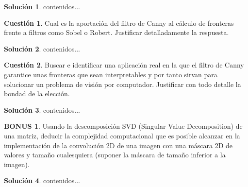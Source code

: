 \documentclass[a4paper, 11pt]{article}
\theoremstyle{definition}
\newtheorem{cuestion}{Cuestión}
\newtheorem*{solucion}{Solución}
\newtheorem*{bonus}{BONUS}
\begin{document}
  \begin{solucion}
     	contenidos...
  \end{solucion}
  \begin{cuestion}
     	Cual es la aportación del filtro de Canny al cálculo de fronteras
      frente a filtros como Sobel o Robert. Justificar detalladamente la
      respuesta.
  \end{cuestion}

  \begin{solucion}
     	contenidos...
  \end{solucion}
  \begin{cuestion}
     	Buscar e identificar una aplicación real en la que el filtro de
      Canny garantice unas fronteras que sean interpretables y por tanto sirvan
       para solucionar un problema de visión por computador.
        Justificar con todo detalle la bondad de la elección.

  \end{cuestion}

  \begin{solucion}
     	contenidos...
  \end{solucion}
  \begin{bonus}
     	Usando la descomposición SVD (Singular Value
      Decomposition) de una matriz, deducir la complejidad computacional que es
      posible alcanzar en la implementación de la convolución 2D de una imagen
      con una máscara 2D de valores y tamaño cualesquiera (suponer la máscara de
      tamaño inferior a la imagen).

  \end{bonus}

  \begin{solucion}
     	contenidos...
  \end{solucion}
\end{document}
